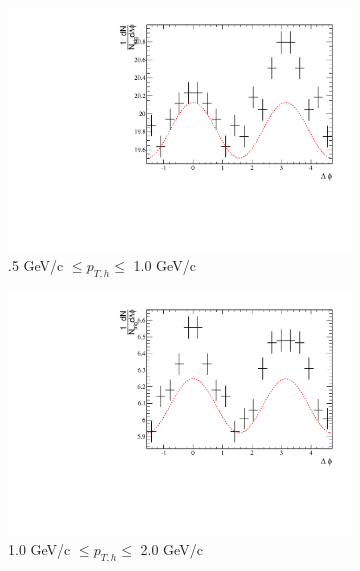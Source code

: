 \begin{figure}[htbp]
	\begin{subfigure}{0.5\textwidth}
		\includegraphics[width=\textwidth]{Plots/Correlations/raw/NPE_eh_corr_raw_primpt_4_5_cent_4_5_assopt_1_1.pdf}
		\caption{.5 GeV/c $\leq p_{T,h} \leq$ 1.0 GeV/c}
		\label{fig:Raw2040a}
	\end{subfigure}	
	\begin{subfigure}{0.5\textwidth}
		\includegraphics[width=\textwidth]{Plots/Correlations/raw/NPE_eh_corr_raw_primpt_4_5_cent_4_5_assopt_2_2.pdf}
		\caption{1.0 GeV/c $\leq p_{T,h} \leq$ 2.0 GeV/c}
		\label{fig:Raw2040b}
	\end{subfigure}	
\begin{center}
	\begin{subfigure}{0.5\textwidth}

\end{subfigure}
\end{center}
\end{figure}
